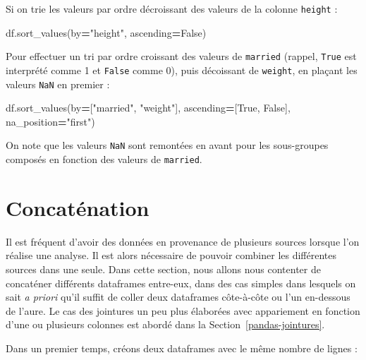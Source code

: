 \documentclass[12pt,]{book}
\newenvironment{Shaded}{\begin{snugshade}}{\end{snugshade}}
\newcommand{\StringTok}[1]{\textcolor[rgb]{0.31,0.60,0.02}{#1}}
\newcommand{\VariableTok}[1]{\textcolor[rgb]{0.00,0.00,0.00}{#1}}
\newcommand{\OperatorTok}[1]{\textcolor[rgb]{0.81,0.36,0.00}{\textbf{#1}}}
\newcommand{\NormalTok}[1]{#1}
\numberwithin{equation}{section}
\numberwithin{countremarque}{section}
\begin{document}
Si on trie les valeurs par ordre décroissant des valeurs de la colonne
\texttt{height} :

\begin{Shaded}
\begin{Highlighting}[]
\NormalTok{df.sort_values(by}\OperatorTok{=}\StringTok{"height"}\NormalTok{, ascending}\OperatorTok{=}\VariableTok{False}\NormalTok{)}
\end{Highlighting}
\end{Shaded}

Pour effectuer un tri par ordre croissant des valeurs de
\texttt{married} (rappel, \texttt{True} est interprété comme 1 et
\texttt{False} comme 0), puis décoissant de \texttt{weight}, en plaçant
les valeurs \texttt{NaN} en premier :

\begin{Shaded}
\begin{Highlighting}[]
\NormalTok{df.sort_values(by}\OperatorTok{=}\NormalTok{[}\StringTok{"married"}\NormalTok{, }\StringTok{"weight"}\NormalTok{],}
\NormalTok{               ascending}\OperatorTok{=}\NormalTok{[}\VariableTok{True}\NormalTok{, }\VariableTok{False}\NormalTok{],}
\NormalTok{               na_position}\OperatorTok{=}\StringTok{"first"}\NormalTok{)}
\end{Highlighting}
\end{Shaded}

On note que les valeurs \texttt{NaN} sont remontées en avant pour les
sous-groupes composés en fonction des valeurs de \texttt{married}.

\section{Concaténation}\label{concatenation}

Il est fréquent d'avoir des données en provenance de plusieurs sources
lorsque l'on réalise une analyse. Il est alors nécessaire de pouvoir
combiner les différentes sources dans une seule. Dans cette section,
nous allons nous contenter de concaténer différents dataframes
entre-eux, dans des cas simples dans lesquels on sait \emph{a priori}
qu'il suffit de coller deux dataframes côte-à-côte ou l'un en-dessous de
l'aure. Le cas des jointures un peu plus élaborées avec appariement en
fonction d'une ou plusieurs colonnes est abordé dans la
Section~\ref{pandas-jointures}.

Dans un premier temps, créons deux dataframes avec le même nombre de
lignes :
\end{document}
